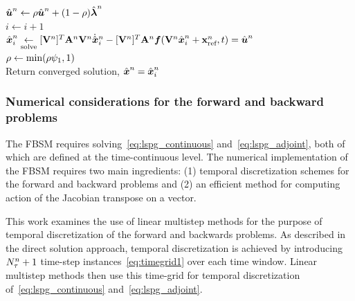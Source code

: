 \begin{algorithm}
{${\hat{\boldsymbol u}^{n}}  \leftarrow \rho {\hat{\boldsymbol u}^{n}} + (1 - \rho) \hat{\boldsymbol \lambda}^{n}$ \\
$i \leftarrow i+1$ \\
$\hat{ \boldsymbol x}^{n}_i \underset{\text{solve}}{\leftarrow} [\mathbf {V}^{n}]^T \mathbf{A}^{n} \mathbf {V}^{n} \dot{\hat{ \boldsymbol x}}^{n}_i   -  [\mathbf {V}^{n}]^T \mathbf{A}^{n} \boldsymbol f(\mathbf {V}^{n} \hat{ \boldsymbol x}^n_i + \mathbf{x}_\text{ref}^{n},t) =  {\hat{\boldsymbol u}^{n}} $
\\
{
$\rho \leftarrow \text{min}(\rho \psi_1,1)$ \\
}
}
Return converged solution, $\hat{ \boldsymbol x}^{n}= \hat{ \boldsymbol x}^{n}_i$
\end{algorithm}
\subsubsection{Numerical considerations for the forward and backward problems}
The FBSM requires solving~\eqref{eq:lspg_continuous} and~\eqref{eq:lspg_adjoint}, both of which are defined at the time-continuous level. 
The numerical implementation of the FBSM requires two main ingredients: (1) temporal discretization schemes for the forward and backward problems and (2) 
an efficient method for computing action of the Jacobian transpose on a vector.  

This work examines the use of linear multistep methods for the purpose of temporal discretization of the forward and 
backwards problems. As described in  
the direct solution approach, temporal discretization is achieved by introducing $N_{\tau}^{n} + 1$ time-step instances~\eqref{eq:timegrid1} over each time window. Linear multistep methods then use this time-grid for temporal discretization of~\eqref{eq:lspg_continuous} and~\eqref{eq:lspg_adjoint}. 

